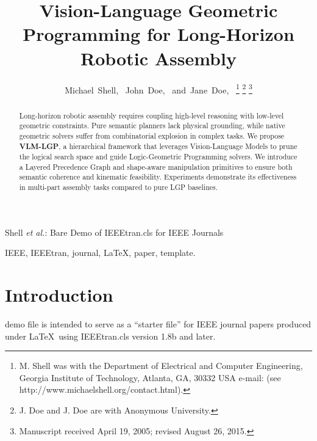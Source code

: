 \documentclass[journal]{IEEEtran}
\begin{document}
  \title{Vision-Language Geometric Programming for Long-Horizon Robotic Assembly}

  \author{Michael~Shell,~ John~Doe,~
  and~Jane~Doe,~
  \thanks{M. Shell was with the Department of Electrical and Computer Engineering,
  Georgia Institute of Technology, Atlanta, GA, 30332 USA e-mail: (see http://www.michaelshell.org/contact.html).}%
  \thanks{J. Doe and J. Doe are with Anonymous University.}%
  \thanks{Manuscript received April 19, 2005; revised August 26, 2015.}}

  {Shell \MakeLowercase{\textit{et al.}}: Bare Demo of IEEEtran.cls for IEEE Journals}

  \maketitle

  \begin{abstract}
    Long-horizon robotic assembly requires coupling high-level reasoning with low-level geometric constraints. Pure semantic planners lack physical grounding, while native geometric solvers suffer from combinatorial explosion in complex tasks. We propose \textbf{VLM-LGP}, a hierarchical framework that leverages Vision-Language Models to prune the logical search space and guide Logic-Geometric Programming solvers. We introduce a Layered Precedence Graph and shape-aware manipulation primitives to ensure both semantic coherence and kinematic feasibility. Experiments demonstrate its effectiveness in multi-part assembly tasks compared to pure LGP baselines.
  \end{abstract}

  \begin{IEEEkeywords}
    IEEE, IEEEtran, journal, \LaTeX, paper, template.
  \end{IEEEkeywords}

  \IEEEpeerreviewmaketitle

  \section{Introduction}

   demo file is intended to serve as a ``starter file'' for
  IEEE journal papers produced under \LaTeX\ using IEEEtran.cls version 1.8b and
  later.
\end{document}
